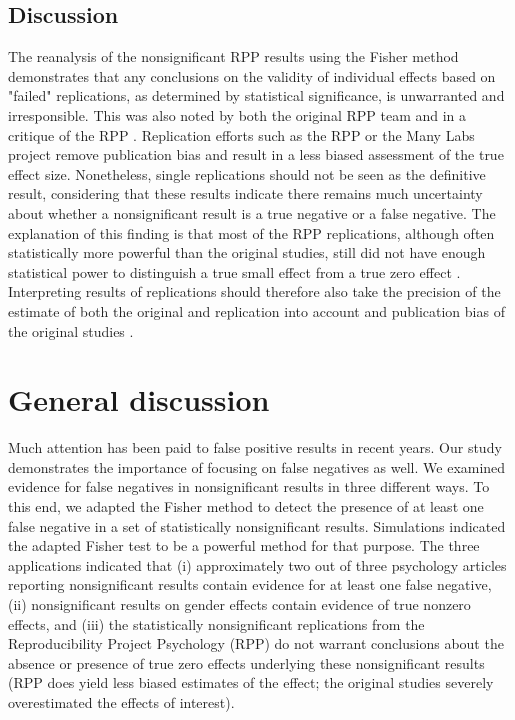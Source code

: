 \documentclass{article}
\begin{document}
\subsection*{Discussion}

The reanalysis of the nonsignificant RPP results using the Fisher method demonstrates that any conclusions on the validity of individual effects based on "failed" replications, as determined by statistical significance, is unwarranted and irresponsible. This was also noted by both the original RPP team \cite{Open_Science_Collaboration2015-zs,Anderson2016-bv} and in a critique of the RPP \cite{Gilbert2016-mi}. Replication efforts such as the RPP or the Many Labs project remove publication bias and result in a less biased assessment of the true effect size. Nonetheless, single replications should not be seen as the definitive result, considering that these results indicate there remains much uncertainty about whether a nonsignificant result is a true negative or a false negative. The explanation of this finding is that most of the RPP replications, although often statistically more powerful than the original studies, still did not have enough statistical power to distinguish a true small effect from a true zero effect \cite{Maxwell2015-yb}. Interpreting results of replications should therefore also take the precision of the estimate of both the original and replication into account \cite{Cumming2014-fi} and publication bias of the original studies \cite{10.1371/journal.pone.0149794}.

\section*{General discussion}

Much attention has been paid to false positive results in recent years. Our study demonstrates the importance of focusing on false negatives as well. We examined evidence for false negatives in nonsignificant results in three different ways. To this end, we adapted the Fisher method to detect the presence of at least one false negative in a set of statistically nonsignificant results. Simulations indicated the adapted Fisher test to be a powerful method for that purpose. The three applications indicated that (i) approximately two out of three psychology articles reporting nonsignificant results contain evidence for at least one false negative, (ii) nonsignificant results on gender effects contain evidence of true nonzero effects, and (iii) the statistically nonsignificant replications from the Reproducibility Project Psychology (RPP) do not warrant conclusions about the absence or presence of true zero effects underlying these nonsignificant results (RPP does yield less biased estimates of the effect; the original studies severely overestimated the effects of interest).
\end{document}
